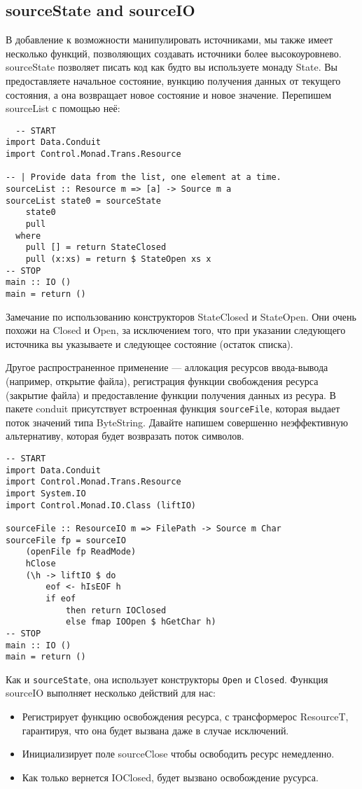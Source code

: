 \subsection{sourceState and sourceIO}

В добавление к возможности манипулировать источниками, мы также имеет несколько функций,
позволяющих создавать источники более высокоуровнево. sourceState позволяет писать
код как будто вы используете монаду State. Вы предоставляете начальное состояние,
вункцию получения данных от текущего состояния, а она возвращает новое состояние и
новое значение. Перепишем sourceList с помощью неё:

\begin{lstlisting}
  -- START
import Data.Conduit
import Control.Monad.Trans.Resource

-- | Provide data from the list, one element at a time.
sourceList :: Resource m => [a] -> Source m a
sourceList state0 = sourceState
    state0
    pull
  where
    pull [] = return StateClosed
    pull (x:xs) = return $ StateOpen xs x
-- STOP
main :: IO ()
main = return ()
\end{lstlisting}

Замечание по использованию конструкторов StateClosed и StateOpen. Они очень похожи на
Closed и Open, за исключением того, что при указании следующего источника вы указываете и
следующее состояние (остаток списка).

Другое распространенное применение --- аллокация ресурсов ввода-вывода (например,
открытие файла), регистрация функции свобождения ресурса (закрытие файла) и
предоставление функции получения данных из ресура.
В пакете conduit присутствует встроенная функция \verb=sourceFile=, которая выдает поток
значений типа ByteString. Давайте напишем совершенно неэффективную альтернативу,
которая будет возвразать поток символов.

\begin{lstlisting}
-- START
import Data.Conduit
import Control.Monad.Trans.Resource
import System.IO
import Control.Monad.IO.Class (liftIO)

sourceFile :: ResourceIO m => FilePath -> Source m Char
sourceFile fp = sourceIO
    (openFile fp ReadMode)
    hClose
    (\h -> liftIO $ do
        eof <- hIsEOF h
        if eof
            then return IOClosed
            else fmap IOOpen $ hGetChar h)
-- STOP
main :: IO ()
main = return ()
\end{lstlisting}

Как и \verb=sourceState=, она использует конструкторы \verb*|Open| и \verb*|Closed|.
Функция sourceIO выполняет несколько действий  для нас:
\begin{itemize}
 \item Регистрирует функцию освобождения ресурса, с трансформерос ResourceT,
гарантируя, что она будет вызвана даже в случае исключений.
 \item Инициализирует поле sourceClose чтобы освободить ресурс немедленно.
 \item Как только вернется IOClosed, будет вызвано освобождение русурса.
\end{itemize}
  
